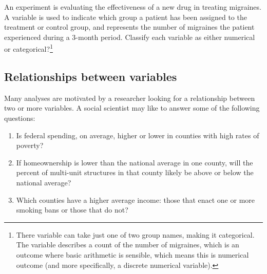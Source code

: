 \begin{exercise} 
An experiment is evaluating the effectiveness of a new drug
in treating migraines.
A  variable is used to indicate which group a patient
has been assigned to the treatment or control group,
and  represents the number of migraines the
patient experienced during a 3-month period.
Classify each variable as either numerical or
categorical?\footnote{There
   variable can take just one of two group names,
  making it categorical.
  The  variable describes
  a count of the number of migraines, which is an outcome where
  basic arithmetic is sensible, which means this is numerical
  outcome (and more specifically, a discrete numerical variable).}
\end{exercise}

\subsection{Relationships between variables}
\label{variableRelations}

Many analyses are motivated by a researcher looking
for a relationship between two or more variables.
A social scientist may like to answer some of the
following questions:
\begin{enumerate}
\setlength{\itemsep}{0mm}
\item[(1)]\label{fedSpendingPovertyQuestion} Is federal spending, on average, higher or lower in counties with high rates of poverty?
\item[(2)]\label{ownershipMultiUnitQuestion} If homeownership is lower than the national average in one county, will the percent of multi-unit structures in that county likely be above or below the national average?
\item[(3)]\label{isAverageIncomeAssociatedWithSmokingBans} Which counties have a higher average income: those that enact one or more smoking bans or those that do not?
\end{enumerate}



